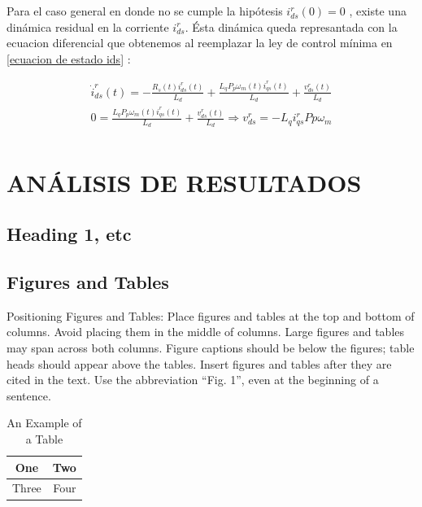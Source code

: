 \documentclass[a4paper, 10pt, onecolumn,journal]{ieeeconf}
\begin{document}
Para el caso general en donde no se cumple la hipótesis $i^{r}_{ds}(0)=0$ , existe una dinámica residual en la corriente $i^{r}_{ds}$. Ésta dinámica queda represantada con la ecuacion diferencial que obtenemos al reemplazar la ley de control mínima en \eqref{ecuacion de estado ids} :

\begin{equation}
	\begin{aligned}
		\dot{i}^r_{ds}(t) = -\frac{R_s(t) i^r_{ds}(t)}{L_d} + \frac{L_q P_p \omega_m(t)i^r_{qs}(t)}{L_d}  + \frac{v^r_{ds}(t)}{L_d}\\
		0= \frac{L_q P_p \omega_m(t)i^r_{qs}(t)}{L_d}  + \frac{v^r_{ds}(t)}{L_d}\Rightarrow	v^{r}_{ds}= -L_{q}i^{r}_{qs}Pp\omega_{m}\\
		\label{ecuacion determinacion ley de control minima}
	\end{aligned}	
\end{equation}



















\section{ANÁLISIS DE RESULTADOS}


\subsection{Heading 1, etc}


\subsection{Figures and Tables}

Positioning Figures and Tables: Place figures and tables at the top and bottom of columns. Avoid placing them in the middle of columns. Large figures and tables may span across both columns. Figure captions should be below the figures; table heads should appear above the tables. Insert figures and tables after they are cited in the text. Use the abbreviation ``Fig. 1'', even at the beginning of a sentence.

\begin{table}[h]
\caption{An Example of a Table}
\label{table_example}
\begin{center}
\begin{tabular}{|c||c|}
\hline
One & Two\\
\hline
Three & Four\\
\hline
\end{tabular}
\end{center}
\end{table}
\end{document}
